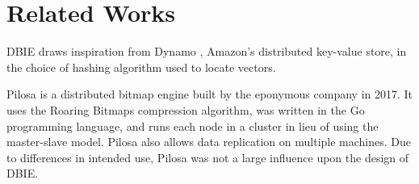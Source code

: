 \section{Related Works}
DBIE draws inspiration from Dynamo \cite{decandia2007}, Amazon's distributed
key-value store, in the choice of hashing algorithm used to locate vectors.
\par
Pilosa \cite{pilosa} is a distributed bitmap engine built by the eponymous
company in 2017. It uses the Roaring Bitmaps \cite{roaring} compression
algorithm, was written in the Go programming language, and runs each node in a
cluster in lieu of using the master-slave model. Pilosa also allows data
replication on multiple machines. Due to differences in intended use,
Pilosa was not a large influence upon the design of DBIE.
